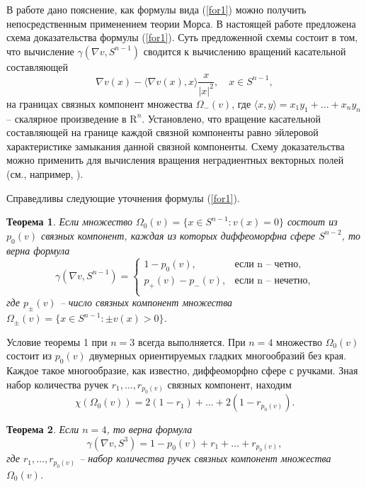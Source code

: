В работе \cite[с. 3-4]{A78} дано пояснение, 
как формулы вида (\ref{for1}) можно получить 
непосредственным применением теории Морса. 
В настоящей работе предложена схема 
доказательства формулы (\ref{for1}). Суть предложенной схемы состоит в том, что вычисление  $\gamma(\nabla v, S^{n-1})$ 
сводится к вычислению вращений  касательной составляющей
$$
\nabla v(x)-\langle \nabla v(x) , x \rangle \frac{x}{|x|^2}, 
\quad x\in S^{n-1},
$$
 на границах связных компонент множества $\Omega_-(v)$, где 
$
\langle x , y \rangle = x_1y_1 + \ldots + x_ny_n
$
 --  скалярное произведение в $\mathrm{R}^n$.
Установлено, что вращение касательной составляющей на границе каждой 
связной компоненты равно эйлеровой характеристике замыкания
данной связной компоненты. 
 Схему доказательства  можно
применить для вычисления вращения неградиентных векторных полей (см., например, \cite{MN23}). 

Справедливы следующие уточнения формулы (\ref{for1}).

{\bf Теорема 1}. {\it Если множество
$
\Omega_0(v)=\{x\in S^{n-1} : v(x)=0 \}
$
состоит из $p_0(v)$ связных компонент, каждая из которых диффеоморфна сфере $S^{n-2}$, то верна формула
$$
\gamma(\nabla v, S^{n-1})=\left\{
\begin{array}{cl}
1-p_0(v), & \text{если n -- четно,}\\
p_+(v)-p_-(v), & \text{если n -- нечетно,}\\
\end{array}
\right.
$$
где $p_{\pm}(v)$ -- число связных компонент множества 
$\Omega_{\pm}(v)=\{x\in S^{n-1} : \pm v(x)>0 \}$.
}

Условие теоремы 1 при $n=3$  всегда выполняется. При $n=4$ 
  множество $\Omega_0(v)$ состоит из $p_0(v)$ двумерных
ориентируемых гладких многообразий без края. Каждое такое многообразие,
как известно, диффеоморфно сфере с ручками. Зная набор количества ручек
$r_1, \ldots , r_{p_0(v)}$ связных компонент, находим
$$
\chi(\Omega_0(v))=2(1-r_1) +  \ldots + 2(1- r_{p_0(v)}).
$$

{\bf Теорема 2}. {\it Если $n=4$, то верна формула
$$
\gamma(\nabla v, S^{3})=1 - p_0(v) + r_1  +  \ldots + r_{p_0(v)},
$$
где $r_1, \ldots , r_{p_0(v)}$ --  набор количества ручек связных компонент 
множества $\Omega_0(v)$.
}

